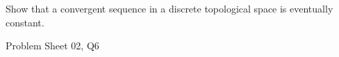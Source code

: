 \begin{samepage}
\begin{ex}
Show that a convergent sequence in a discrete topological space is eventually constant.
\end{ex}
\begin{source}
Problem Sheet 02, Q6
\end{source}
\end{samepage}
